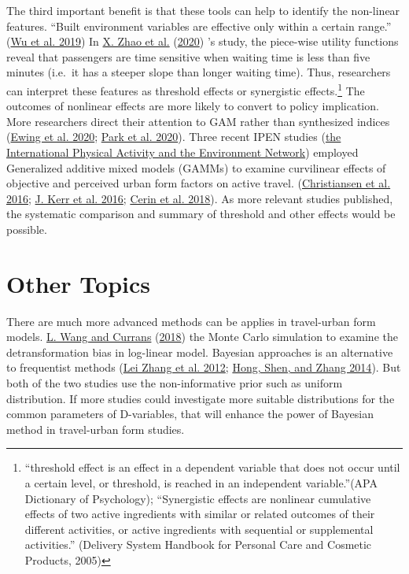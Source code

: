 \documentclass[
  11pt,
  openany]{memoir}
\begin{document}
The third important benefit is that these tools can help to identify the non-linear features.
``Built environment variables are effective only within a certain range.'' (\protect\hyperlink{ref-wuExaminingThresholdEffects2019}{Wu et al. 2019})
In \protect\hyperlink{ref-zhaoPredictionBehavioralAnalysis2020}{X. Zhao et al.} (\protect\hyperlink{ref-zhaoPredictionBehavioralAnalysis2020}{2020}) 's study, the piece-wise utility functions reveal that passengers are time sensitive when waiting time is less than five minutes (i.e.~it has a steeper slope than longer waiting time).
Thus, researchers can interpret these features as threshold effects or synergistic effects.\footnote{``threshold effect is an effect in a dependent variable that does not occur until a certain level, or threshold, is reached in an independent variable.''(APA Dictionary of Psychology); ``Synergistic effects are nonlinear cumulative effects of two active ingredients with similar or related outcomes of their different activities, or active ingredients with sequential or supplemental activities.'' (Delivery System Handbook for Personal Care and Cosmetic Products, 2005)}
The outcomes of nonlinear effects are more likely to convert to policy implication.
More researchers direct their attention to GAM rather than synthesized indices (\protect\hyperlink{ref-ewingReducingVehicleMiles2020}{Ewing et al. 2020}; \protect\hyperlink{ref-parkGuidelinesPolycentricRegion2020}{Park et al. 2020}).
Three recent IPEN studies (\href{http://www.ipenproject.org/IPEN_adult.html}{the International Physical Activity and the Environment Network}) employed Generalized additive mixed models (GAMMs) to examine curvilinear effects of objective and perceived urban form factors on active travel. (\protect\hyperlink{ref-christiansenInternationalComparisonsAssociations2016}{Christiansen et al. 2016}; \protect\hyperlink{ref-kerrPerceivedNeighborhoodEnvironmental2016}{J. Kerr et al. 2016}; \protect\hyperlink{ref-cerinObjectivelyassessedNeighbourhoodDestination2018}{Cerin et al. 2018}).
As more relevant studies published, the systematic comparison and summary of threshold and other effects would be possible.

\hypertarget{other-topics}{%
\section{Other Topics}\label{other-topics}}

There are much more advanced methods can be applies in travel-urban form models.
\protect\hyperlink{ref-wangDetransformationBiasNonlinear2018}{L. Wang and Currans} (\protect\hyperlink{ref-wangDetransformationBiasNonlinear2018}{2018}) the Monte Carlo simulation to examine the detransformation bias in log-linear model.
Bayesian approaches is an alternative to frequentist methods (\protect\hyperlink{ref-zhangHowBuiltEnvironment2012}{Lei Zhang et al. 2012}; \protect\hyperlink{ref-hongHowBuiltenvironmentFactors2014}{Hong, Shen, and Zhang 2014}).
But both of the two studies use the non-informative prior such as uniform distribution. If more studies could investigate more suitable distributions for the common parameters of D-variables, that will enhance the power of Bayesian method in travel-urban form studies.
\end{document}
